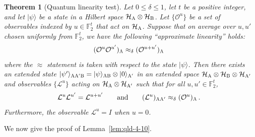 \documentclass[11pt]{article}
\newtheorem{theorem}{Theorem}[section]
\theoremstyle{definition}
\newcommand{\ket}[1]{|#1\rangle}
\newcommand{\Id}{\ensuremath{I}}
\newcommand{\F}{\ensuremath{\mathbb{F}}}
\newcommand{\labelstyle}[1]{\ensuremath{\textsc{#1}}\xspace}
\newcommand{\alice}{\labelstyle{A}}
\newcommand{\bob}{\labelstyle{B}}
\begin{document}
	\begin{theorem}[Quantum linearity test]
	\label{thm:linearity}
		Let $0 \leq \delta \leq 1$, let $t$ be a positive integer, and let $\ket{\psi}$ be a state in a Hilbert space $\mathcal{H}_\alice \otimes \mathcal{H}_\bob$. Let $\{\mathcal{O}^u \}$ be a set of observables indexed by $u \in \F_2^t$ that act on $\mathcal{H}_\alice$. Suppose that on average over $u, u'$ chosen uniformly from $\F_2^t$, we have the following ``approximate linearity'' holds:
		\[
(\mathcal{O}^u \mathcal{O}^{u'})_{\alice} \approx_\delta (\mathcal{O}^{u+u'})_{\alice}
		\]
		where the $\approx$ statement is taken with respect to the state $\ket{\psi}$. 
Then there exists an extended state $\ket{\psi'}_{\alice \alice' \bob} = \ket{\psi}_{\alice \bob} \otimes \ket{0}_{\alice'}$ in an extended space $\mathcal{H}_{\alice} \otimes \mathcal{H}_\bob \otimes \mathcal{H}_{\alice'}$ and observables $\{ \mathcal{L}^u \}$ acting on $\mathcal{H}_\alice \otimes \mathcal{H}_{\alice'}$ such that for all $u, u' \in \F_2^t$, 
		\[
			\mathcal{L}^u \mathcal{L}^{u'} = \mathcal{L}^{u + u'} \qquad \text{and} \qquad (\mathcal{L}^u)_{\alice \alice'} \approx_\delta (\mathcal{O}^u)_\alice \,.
		\]
		Furthermore, the observable $\mathcal{L}^u = \Id$ when $u = 0$.
	\end{theorem}
		
		We now give the proof of Lemma~\ref{lem:qld-4-10}.
		
\end{document}
